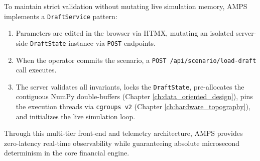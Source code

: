 To maintain strict validation without mutating live simulation memory, AMPS implements a \texttt{DraftService} pattern:
\begin{enumerate}
    \item Parameters are edited in the browser via HTMX, mutating an isolated server-side \texttt{DraftState} instance via \texttt{POST} endpoints.
    \item When the operator commits the scenario, a \texttt{POST /api/scenario/load-draft} call executes.
    \item The server validates all invariants, locks the \texttt{DraftState}, pre-allocates the contiguous NumPy double-buffers (Chapter \ref{ch:data_oriented_design}), pins the execution threads via \texttt{cgroups v2} (Chapter \ref{ch:hardware_topography}), and initializes the live simulation loop.
\end{enumerate}

Through this multi-tier front-end and telemetry architecture, AMPS provides zero-latency real-time observability while guaranteeing absolute microsecond determinism in the core financial engine.
